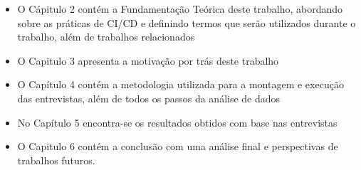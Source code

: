  \begin{itemize}
     \item O Cápitulo 2 contém a Fundamentação Teórica deste trabalho, abordando sobre as práticas de CI/CD e definindo termos que serão utilizados durante o trabalho, além de trabalhos relacionados
     \item O Capitulo 3 apresenta a motivação por trás deste trabalho
     \item O Capítulo 4 contém a metodologia utilizada para a montagem e execução das entrevistas, além de todos os passos da análise de dados
     \item No Capítulo 5 encontra-se os resultados obtidos com base nas entrevistas
     \item O Capitulo 6 contém a conclusão com uma análise final e perspectivas de trabalhos futuros.
 \end{itemize}
